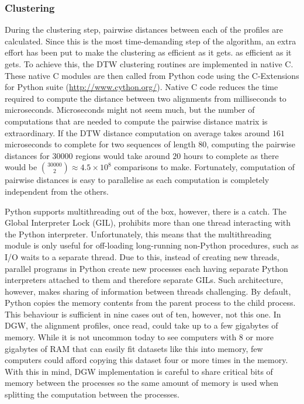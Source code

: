 \documentclass[parskip]{cs4rep}
\begin{document}
\subsubsection{Clustering}
During the clustering step, pairwise distances between each of the profiles are calculated.
Since this is the most time-demanding step of the algorithm, an extra effort has been put to make the clustering as efficient as it gets. as efficient as it gets. To achieve this, the DTW clustering routines are implemented in native C. These native C modules are then called from Python code using the C-Extensions for Python suite (\url{http://www.cython.org/}). Native C code reduces the time required to compute the distance between two alignments from milliseconds to microseconds. Microseconds might not seem much, but the number of computations that are needed to compute the pairwise distance matrix is extraordinary. If the DTW distance computation on average takes around $161$ microseconds to complete for two sequences of length 80, computing the pairwise distances for $30000$ regions would take around $20$ hours to complete as there would be ${30000 \choose 2} \approx 4.5 \times 10^8$ comparisons to make. Fortunately, computation of pairwise distances is easy to parallelise as each computation is completely independent from the others.

Python supports multithreading out of the box, however, there is a catch. The Global Interpreter Lock (GIL), prohibits more than one thread interacting with the Python interpreter. Unfortunately, this means that the multithreading module is only useful for off-loading long-running non-Python procedures, such as I/O waits to a separate thread. Due to this, instead of creating new threads, parallel programs in Python create new processes each having separate Python interpreters attached to them and therefore separate GILs. Such architecture, however, makes sharing of information between threads challenging.
By default, Python copies the memory contents from the parent process to the child process. This behaviour is sufficient in nine cases out of ten, however, not this one. In DGW, the alignment profiles, once read, could take up to a few gigabytes of memory. While it is not uncommon today to see computers with 8 or more gigabytes of RAM that can easily fit datasets like this into memory, few computers could afford copying this dataset four or more times in the memory. With this in mind, DGW implementation is careful to share critical bits of memory between the processes so the same amount of memory is used when splitting the computation between the processes.
\end{document}
